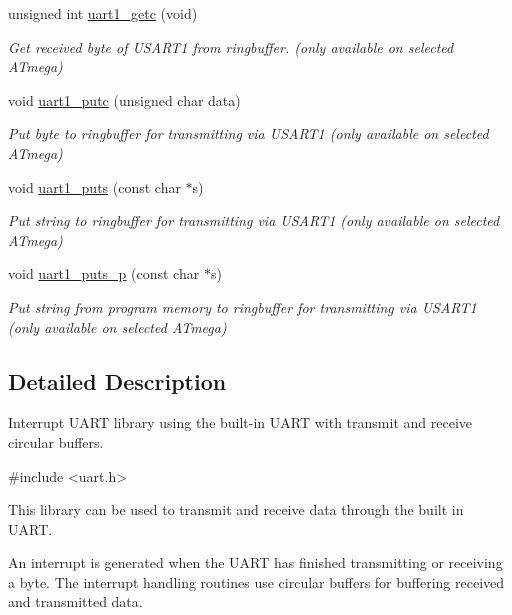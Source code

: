\begin{DoxyCompactItemize}
unsigned int \hyperlink{group__pfleury__uart_gaeb1405c641e5bc9b7224018f5e8d90de}{uart1\-\_\-getc} (void)
\begin{DoxyCompactList}\small\item\em Get received byte of U\-S\-A\-R\-T1 from ringbuffer. (only available on selected A\-Tmega) \end{DoxyCompactList}\item 
void \hyperlink{group__pfleury__uart_gab465f689d197fadfbacc374fc9411154}{uart1\-\_\-putc} (unsigned char data)
\begin{DoxyCompactList}\small\item\em Put byte to ringbuffer for transmitting via U\-S\-A\-R\-T1 (only available on selected A\-Tmega) \end{DoxyCompactList}\item 
void \hyperlink{group__pfleury__uart_ga5568f8f3913b218fd4d0346af78831b2}{uart1\-\_\-puts} (const char $\ast$s)
\begin{DoxyCompactList}\small\item\em Put string to ringbuffer for transmitting via U\-S\-A\-R\-T1 (only available on selected A\-Tmega) \end{DoxyCompactList}\item 
void \hyperlink{group__pfleury__uart_ga1e8074d0a2d5922601c5db2f9777ba79}{uart1\-\_\-puts\-\_\-p} (const char $\ast$s)
\begin{DoxyCompactList}\small\item\em Put string from program memory to ringbuffer for transmitting via U\-S\-A\-R\-T1 (only available on selected A\-Tmega) \end{DoxyCompactList}\end{DoxyCompactItemize}


\subsection{Detailed Description}
Interrupt U\-A\-R\-T library using the built-\/in U\-A\-R\-T with transmit and receive circular buffers. 
\begin{DoxyCode}
\textcolor{preprocessor}{ #include <uart.h>} 
\end{DoxyCode}


This library can be used to transmit and receive data through the built in U\-A\-R\-T.

An interrupt is generated when the U\-A\-R\-T has finished transmitting or receiving a byte. The interrupt handling routines use circular buffers for buffering received and transmitted data.


